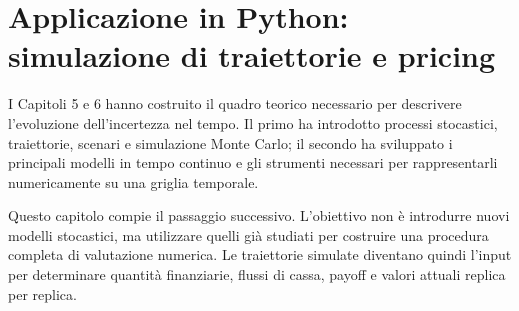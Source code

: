



\chapter{Applicazione in Python: simulazione di traiettorie e
pricing}

\label{cap:python-traiettorie-pricing}


I Capitoli 5 e 6 hanno costruito il quadro teorico necessario per
descrivere l'evoluzione dell'incertezza nel tempo. Il primo ha introdotto
processi stocastici, traiettorie, scenari e simulazione Monte Carlo; il
secondo ha sviluppato i principali modelli in tempo continuo e gli
strumenti necessari per rappresentarli numericamente su una griglia
temporale.

Questo capitolo compie il passaggio successivo. L'obiettivo non \`e
introdurre nuovi modelli stocastici, ma utilizzare quelli gi\`a studiati
per costruire una procedura completa di valutazione numerica. Le
traiettorie simulate diventano quindi l'input per determinare quantit\`a
finanziarie, flussi di cassa, payoff e valori attuali replica per replica.

